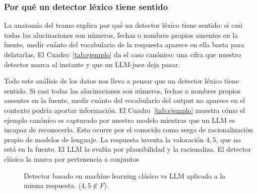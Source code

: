 \documentclass[12pt,a4paper]{report}
\theoremstyle{definition}
\newcommand{\tc}[1]{\texttt{#1}}
\begin{document}
\subsubsection{Por qué un detector léxico tiene sentido}

La anatomía del tramo explica por qué un detector léxico tiene sentido: si casi todas las
alucinaciones son números, fechas o nombres propios ausentes en la fuente, medir cuánto del
vocabulario de la respuesta aparece en ella basta para delatarlas. El Cuadro~\ref{tab:ejemplo}
da el caso canónico: una cifra que nuestro detector marca al instante y que un LLM-juez deja
pasar.

Todo este análisis de los datos nos lleva a pensar que un detector léxico tiene sentido. Si casi todas las
alucinaciones son números, fechas o nombres propios ausentes en la fuente, medir cuánto del
vocabulario del output no aparece en el contexto podría aportar información. El Cuadro~\ref{tab:ejemplo} muestra cómo el ejemplo canónico es capturado por nuestro modelo mientras que un LLM es incapaz de reconocerlo. Esto ocurre por el conocido como sesgo de racionalización propio de modelos de lenguaje. La respuesta inventa la valoración $4{,}5$, que
no está en la fuente. El LLM la evalúa por plausibilidad y la racionaliza. El detector
clásico la marca por pertenencia a conjuntos


\begin{figure}[H]
\centering
{}
\caption{Detector basado en machine learning clásico vs LLM aplicado a la misma respuesta. ($4{,}5\notin F$).}
\label{fig:ejemplo-esquema}
\end{figure}
\end{document}
